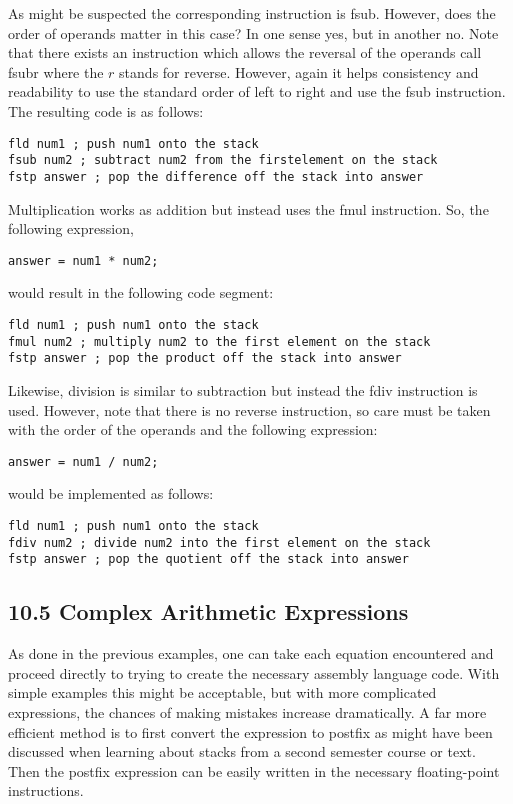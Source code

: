 \documentclass[10pt]{article}
\begin{document}
As might be suspected the corresponding instruction is fsub. However, does the order of operands matter in this case? In one sense yes, but in another no. Note that there exists an instruction which allows the reversal of the operands call fsubr where the $r$ stands for reverse. However, again it helps consistency and readability to use the standard order of left to right and use the fsub instruction. The resulting code is as follows:

\begin{verbatim}
fld num1 ; push num1 onto the stack
fsub num2 ; subtract num2 from the firstelement on the stack
fstp answer ; pop the difference off the stack into answer
\end{verbatim}

Multiplication works as addition but instead uses the fmul instruction. So, the following expression,

\begin{verbatim}
answer = num1 * num2;
\end{verbatim}

would result in the following code segment:

\begin{verbatim}
fld num1 ; push num1 onto the stack
fmul num2 ; multiply num2 to the first element on the stack
fstp answer ; pop the product off the stack into answer
\end{verbatim}

Likewise, division is similar to subtraction but instead the fdiv instruction is used. However, note that there is no reverse instruction, so care must be taken with the order of the operands and the following expression:

\begin{verbatim}
answer = num1 / num2;
\end{verbatim}

would be implemented as follows:

\begin{verbatim}
fld num1 ; push num1 onto the stack
fdiv num2 ; divide num2 into the first element on the stack
fstp answer ; pop the quotient off the stack into answer
\end{verbatim}

\subsection*{10.5 Complex Arithmetic Expressions}
As done in the previous examples, one can take each equation encountered and proceed directly to trying to create the necessary assembly language code. With simple examples this might be acceptable, but with more complicated expressions, the chances of making mistakes increase dramatically. A far more efficient method is to first convert the expression to postfix as might have been discussed when learning about stacks from a second semester course or text. Then the postfix expression can be easily written in the necessary floating-point instructions.
\end{document}
